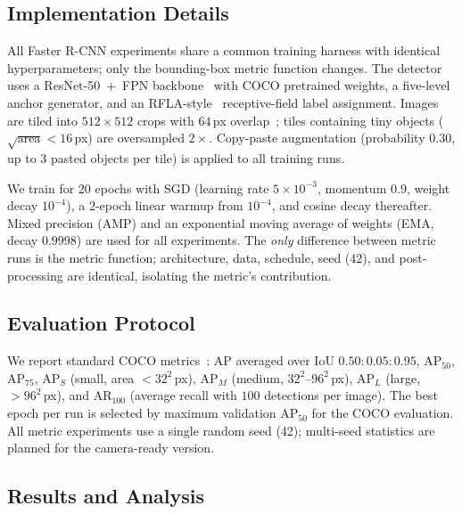 \subsection{Implementation Details}
\label{sec:exp-impl}

All Faster R-CNN experiments share a common training harness with identical
hyperparameters; only the bounding-box metric function changes. The detector
uses a ResNet-50~+~FPN backbone~\cite{he2016resnet,lin2017fpn} with COCO
pretrained weights, a five-level anchor generator, and an RFLA-style~\cite{xu2022rfla}
receptive-field label assignment. Images are tiled into $512\times512$ crops
with $64$\,px overlap~\cite{akyon2022sahi}; tiles containing tiny objects
($\sqrt{\text{area}}<16$\,px) are oversampled $2\times$. Copy-paste
augmentation (probability $0.30$, up to $3$ pasted objects per tile) is
applied to all training runs.

We train for $20$ epochs with SGD (learning rate $5\times10^{-3}$, momentum
$0.9$, weight decay $10^{-4}$), a $2$-epoch linear warmup from $10^{-4}$, and
cosine decay thereafter. Mixed precision (AMP) and an exponential moving
average of weights (EMA, decay $0.9998$) are used for all experiments. The
\emph{only} difference between metric runs is the metric function;
architecture, data, schedule, seed (42), and post-processing are identical,
isolating the metric's contribution.

\subsection{Evaluation Protocol}
\label{sec:exp-eval}

We report standard COCO metrics~\cite{lin2014coco}: AP averaged over IoU
$0.50{:}0.05{:}0.95$, AP$_{50}$, AP$_{75}$, AP$_{S}$ (small, area
$<32^2$\,px), AP$_{M}$ (medium, $32^2$--$96^2$\,px), AP$_{L}$ (large,
$>96^2$\,px), and AR$_{100}$ (average recall with $100$ detections per
image). The best epoch per run is selected by maximum validation AP$_{50}$
for the COCO evaluation. All metric experiments use a single random seed
(42); multi-seed statistics are planned for the camera-ready version.

\subsection{Results and Analysis}
\label{sec:exp-results}


